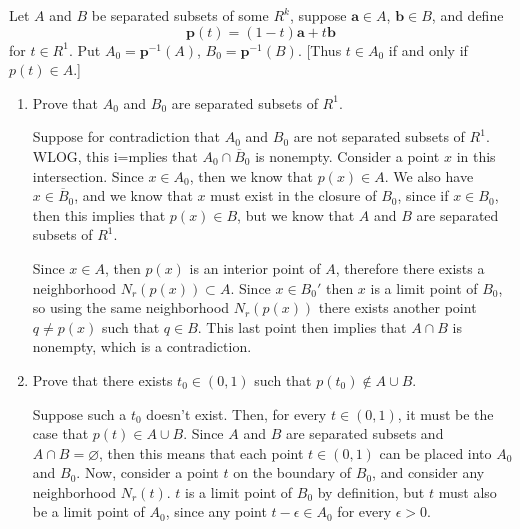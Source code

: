 \documentclass[10pt]{article}
\begin{document}
	\begin{problem}
		Let \( A \) and \( B \) be separated subsets of some \( R^{k} \), suppose \( \mathbf a \in A \), 
		\( \mathbf b \in B \), and define
		\[
		\mathbf p(t) = (1 - t) \mathbf a + t \mathbf b
		\] 
		for \( t \in R^{1} \). Put \( A_0 = \mathbf p^{-1}(A) \), \( B_0 = \mathbf p^{-1}(B) \). [Thus 
		\( t \in A_0 \) if and only if \( p(t) \in A \).]
		\begin{enumerate}[label=\alph*)]
			\item Prove that \( A_0 \) and \( B_0 \) are separated subsets of \( R^{1} \). 

				\begin{solution}
					Suppose for contradiction that \( A_0 \) and \( B_0 \) are not separated subsets of \( R^{1} \). 
					WLOG, this i=mplies that \( A_0 \cap \overline B_0 \) is nonempty. Consider
					a point \( x \) in this intersection. Since \( x \in A_0 \), then 
					we know that \( p(x) \in A \). We also have \( x \in \overline B_0 \), and we know that 
					\( x  \) must exist in the closure of \( B_0 \), since if \( x \in B_0 \), then this 
					implies that \( p(x) \in B \), but we know that \( A \) and \( B \) are separated
					subsets of \( R^{1} \). 

					Since \( x \in A \), then \( p(x) \) is an interior point of \( A \), 
					therefore there exists a neighborhood \( N_r(p(x)) \subset A \). 
					Since \( x \in B_0' \) then \( x \) is a limit point of \( B_0 \), so using the same 
					neighborhood \( N_r(p(x)) \) there exists another point \( q \neq p(x) \) such that 
					\( q \in B \). This last point then implies that \( A \cap B \) is nonempty, 
					which is a contradiction. 
				\end{solution}
			\item Prove that there exists \( t_0 \in (0, 1) \) such that \( p(t_0) \not \in A \cup B \). 

				\begin{solution}
					Suppose such a \( t_0 \) doesn't exist. Then, for every \( t \in (0, 1) \), it must be the 
					case that \( p(t) \in A \cup B \). Since \( A \) and \( B \) are separated 
					subsets and \( A \cap B = \varnothing \), then this means that each point \( t \in (0, 1) \) 
					can be placed into \( A_0  \) and \( B_0 \). Now, consider a point 
					\( t \) on the boundary of \( B_0 \), and consider any neighborhood \( N_r(t) \). \( t \) is 
					a limit point of \( B_0 \) by definition, but \( t \) must also be a limit point of \( A_0 \),
					since any point \( t - \epsilon \in A_0 \) for every \( \epsilon > 0 \). 


\end{solution}
\end{enumerate}
\end{problem}
\end{document}
